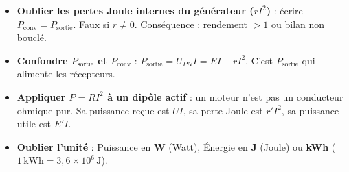 \documentclass[11pt]{article}
\begin{document}
\begin{attention}
\begin{itemize}
\item \textbf{Oublier les pertes Joule internes du générateur ($rI^2$)} : écrire $P_{\text{conv}} = P_{\text{sortie}}$. Faux si $r \neq 0$. Conséquence : rendement $> 1$ ou bilan non bouclé.
\item \textbf{Confondre $P_{\text{sortie}}$ et $P_{\text{conv}}$} : $P_{\text{sortie}} = U_{PN}I = EI - rI^2$. C'est $P_{\text{sortie}}$ qui alimente les récepteurs.
\item \textbf{Appliquer $P = RI^2$ à un dipôle actif} : un moteur n'est pas un conducteur ohmique pur. Sa puissance reçue est $UI$, sa perte Joule est $r'I^2$, sa puissance utile est $E'I$.
\item \textbf{Oublier l'unité} : Puissance en \textbf{W} (Watt), Énergie en \textbf{J} (Joule) ou \textbf{kWh} ($1\,\text{kWh} = 3,6 \times 10^6\,\text{J}$).
\end{itemize}
\end{attention}
\end{document}
